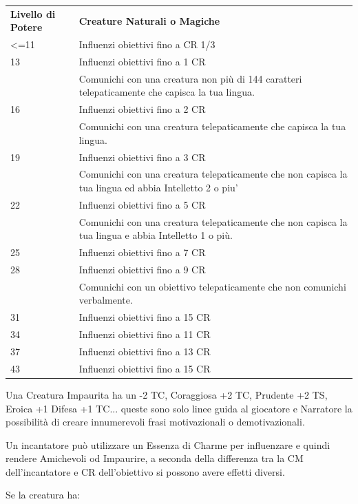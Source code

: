 \documentclass[a4paper,10 pt,twoside,openany]{book}
\begin{document}
\begin{tabularx}{0.95\textwidth}{lX}
	\toprule
	\textbf{Livello di Potere} & \textbf{Creature Naturali o Magiche}\\
	<=11  & Influenzi obiettivi fino a CR 1/3\\
	13    & Influenzi obiettivi fino a 1 CR  \\
	& Comunichi con una creatura non più di 144 caratteri telepaticamente che capisca la tua lingua. \\
	16    & Influenzi obiettivi fino a 2  CR\\
	& Comunichi con una creatura telepaticamente che capisca la tua lingua.\\
	19    & Influenzi obiettivi fino a 3 CR  \\
	& Comunichi con una creatura telepaticamente che non capisca la tua lingua ed abbia Intelletto 2 o piu' \\
	22    & Influenzi obiettivi fino a 5 CR \\
	& Comunichi con una creatura telepaticamente che non capisca la tua lingua e abbia Intelletto 1 o più.  \\
	25    & Influenzi obiettivi fino a 7 CR \\
	28    & Influenzi obiettivi fino a 9 CR \\
	& Comunichi con un obiettivo telepaticamente che non comunichi verbalmente. \\
	31    & Influenzi obiettivi fino a 15 CR \\
	34    & Influenzi obiettivi fino a 11 CR \\
	37    & Influenzi obiettivi fino a 13 CR \\
	43    & Influenzi obiettivi fino a 15 CR \\
\end{tabularx}

Una Creatura Impaurita ha un -2 TC, Coraggiosa +2 TC, Prudente +2 TS, Eroica +1 Difesa +1 TC... queste sono solo linee guida al giocatore e Narratore la possibilità di creare innumerevoli frasi motivazionali o demotivazionali.

\medskip

Un incantatore può utilizzare un Essenza di Charme per influenzare e quindi rendere Amichevoli od Impaurire, a seconda della differenza tra la CM dell'incantatore e CR dell'obiettivo si possono avere effetti diversi.

\medskip

Se la creatura ha:
\end{document}
